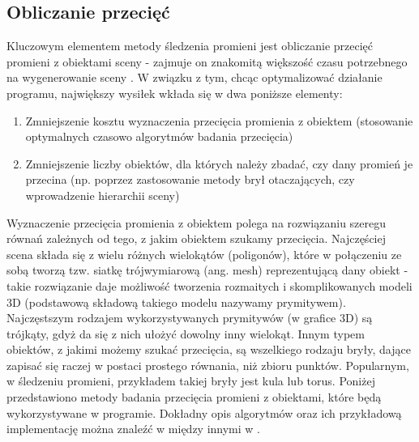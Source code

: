 \subsection{Obliczanie przecięć}

Kluczowym elementem metody śledzenia promieni jest obliczanie przecięć promieni z obiektami sceny - zajmuje on znakomitą większość czasu potrzebnego na  wygenerowanie sceny \cite{suffern2007}. W związku z tym, chcąc optymalizować działanie programu, największy wysiłek wkłada się w dwa poniższe elementy:

\begin{enumerate}

\item Zmniejszenie kosztu wyznaczenia przecięcia promienia z obiektem (stosowanie optymalnych czasowo algorytmów badania przecięcia)

\item Zmniejszenie liczby obiektów, dla których należy zbadać, czy dany promień je przecina (np. poprzez zastosowanie metody brył otaczających, czy wprowadzenie hierarchii sceny)

\end{enumerate}

Wyznaczenie przecięcia promienia z obiektem polega na rozwiązaniu szeregu równań zależnych od tego, z jakim obiektem szukamy przecięcia. Najczęściej scena składa się z wielu różnych wielokątów (poligonów), które w połączeniu ze sobą tworzą tzw. siatkę trójwymiarową (ang. mesh) reprezentującą dany obiekt - takie rozwiązanie daje możliwość tworzenia rozmaitych i skomplikowanych modeli 3D (podstawową składową takiego modelu nazywamy prymitywem). Najczęstszym rodzajem wykorzystywanych prymitywów (w grafice 3D) są trójkąty, gdyż da się z nich ułożyć dowolny inny wielokąt. Innym typem obiektów, z jakimi możemy szukać przecięcia, są wszelkiego rodzaju bryły, dające zapisać się raczej w postaci prostego równania, niż zbioru punktów. Popularnym, w śledzeniu promieni, przykładem takiej bryły jest kula lub torus. Poniżej przedstawiono metody badania przecięcia promieni z obiektami, które będą wykorzystywane w programie. Dokładny opis algorytmów oraz ich przykładową implementację można znaleźć w między innymi w \cite{dunn02, scratch}.

